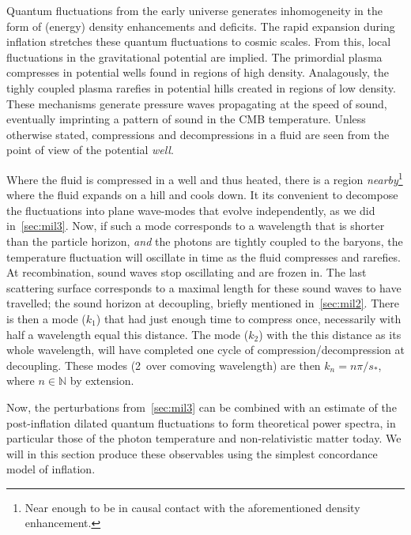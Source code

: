 


Quantum fluctuations from the early universe generates inhomogeneity in the form of (energy) density enhancements and deficits. The rapid expansion during inflation stretches these quantum fluctuations to cosmic scales. From this, local fluctuations in the gravitational potential are implied. The primordial plasma compresses in potential wells found in regions of high density. Analagously, the tighly coupled plasma rarefies in potential hills created in regions of low density. These mechanisms generate pressure waves propagating at the speed of sound, eventually imprinting a pattern of sound in the CMB temperature. Unless otherwise stated, compressions and decompressions in a fluid are seen from the point of view of the potential \textit{well}.

Where the fluid is compressed in a well and thus heated, there is a region \textit{nearby}\footnote{Near enough to be in causal contact with the aforementioned density enhancement.} where the fluid expands on a hill and cools down. It its convenient to decompose the fluctuations into plane wave-modes that evolve independently, as we did in~\cref{sec:mil3}. Now, if such a mode corresponds to a wavelength that is shorter than the particle horizon, \textit{and} the photons are tightly coupled to the baryons, the temperature fluctuation will oscillate in time as the fluid compresses and rarefies. At recombination, sound waves stop oscillating and are frozen in. The last scattering surface corresponds to a maximal length for these sound waves to have travelled; the sound horizon at decoupling, briefly mentioned in~\cref{sec:mil2}. There is then a mode ($k_1$) that had just enough time to compress once, necessarily with half a wavelength equal this distance. The mode ($k_2$) with the this distance as its whole wavelength, will have completed one cycle of compression/decompression at decoupling. These modes (2\textpi~over comoving wavelength) are then $k_n=n\pi/s_*$, where $n\in \mathbb{N}$ by extension.

Now, the perturbations from~\cref{sec:mil3} can be combined with an estimate of the post-inflation dilated quantum fluctuations to form theoretical power spectra, in particular those of the photon temperature and non-relativistic matter today. We will in this section produce these observables using the simplest concordance model of inflation. 

